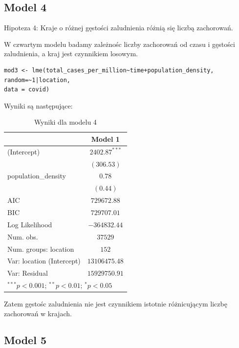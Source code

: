 \documentclass[12pt]{mwbk}
\theoremstyle{plain}
\theoremstyle{definition}
\theoremstyle{remark}
\begin{document}
\subsection{Model 4}

Hipoteza 4: Kraje o różnej gęstości zaludnienia różnią się liczbą zachorowań.

W czwartym modelu badamy zależnośc liczby zachorowań od czasu i gęstości zaludnienia, a kraj jest czynnikiem losowym.

\begin{verbatim}
mod3 <- lme(total_cases_per_million~time+population_density,
random=~1|location,
data = covid)
\end{verbatim}

Wyniki są następujące:

\begin{table}
	\begin{center}
		\begin{tabular}{l c}
			\hline
			& Model 1 \\
			\hline
			(Intercept)               & $2402.87^{***}$ \\
			& $(306.53)$      \\
			population\_density       & $0.78$          \\
			& $(0.44)$        \\
			\hline
			AIC                       & $729672.88$     \\
			BIC                       & $729707.01$     \\
			Log Likelihood            & $-364832.44$    \\
			Num. obs.                 & $37529$         \\
			Num. groups: location     & $152$           \\
			Var: location (Intercept) & $13106475.48$   \\
			Var: Residual             & $15929750.91$   \\
			\hline
			\multicolumn{2}{l}{\scriptsize{$^{***}p<0.001$; $^{**}p<0.01$; $^{*}p<0.05$}}
		\end{tabular}
		\caption{Wyniki dla modelu 4}
		\label{table:model4}
	\end{center}
\end{table}

Zatem gęstośc zaludnienia nie jest czynnikiem istotnie różnicującym liczbę zachorowań w krajach.

\subsection{Model 5}
\end{document}
